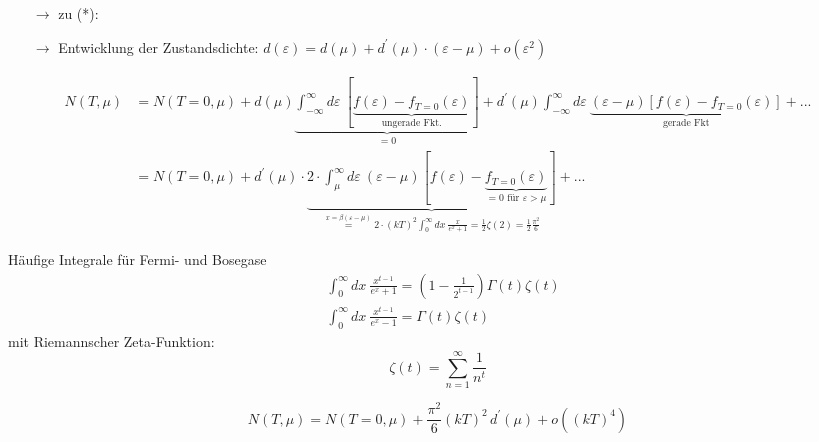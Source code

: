 \begin{itemize}
    \item[$\rightarrow$] zu (*):
    \begin{center}
    \end{center}
    \item[$\rightarrow$] Entwicklung der Zustandsdichte: $d(\varepsilon) = d(\mu) + d^{\prime}(\mu) \cdot (\varepsilon - \mu) + o(\varepsilon^2)$
\end{itemize}

\begin{align}
    N(T,\mu) &= N(T=0,\mu) + d(\mu) \underbrace{\int_{-\infty}^{\infty} d\varepsilon \ [ \underbrace{f(\varepsilon) - f_{T=0}(\varepsilon)}_{\text{ungerade Fkt.}}]}_{=0} + d^{\prime}(\mu) \int_{-\infty}^{\infty} d\varepsilon \ \underbrace{(\varepsilon - \mu) \left[ f(\varepsilon) - f_{T=0}(\varepsilon)\right]}_{\text{gerade Fkt}} + ...\\
    &= N(T=0,\mu) + d^{\prime}(\mu) \cdot \underbrace{2 \cdot \int_{\mu}^{\infty} d\varepsilon \ (\varepsilon - \mu) [ f(\varepsilon) - \underbrace{f_{T=0}(\varepsilon)}_{=0 \text{ für } \varepsilon>\mu}]}_{\stackrel{x = \beta(\varepsilon-\mu)}{=} 2 \cdot (kT)^2 \int_0^{\infty} dx \ \frac{x}{e^x+1} = \frac{1}{2} \zeta(2) = \frac{1}{2} \frac{\pi^2}{6}} + ...
\end{align}

\begin{prop}{Häufige Integrale für Fermi- und Bosegase}
    \begin{align}
        &\int_0^\infty dx \ \frac{x^{t-1}}{e^x +1} = \left(1-\frac{1}{2^{t-1}}\right) \Gamma(t) \zeta(t) \\
        &\int_0^\infty dx \ \frac{x^{t-1}}{e^x -1} =  \Gamma(t) \zeta(t)
    \end{align}
    mit Riemannscher Zeta-Funktion:
    \begin{equation}
        \zeta(t) = \sum_{n=1}^\infty \frac{1}{n^t}
    \end{equation}
\end{prop}
\begin{equation}
    N(T,\mu) = N(T=0,\mu) + \frac{\pi^2}{6}(kT)^2 \, d^{\prime}(\mu) + o((kT)^4)
\end{equation}


